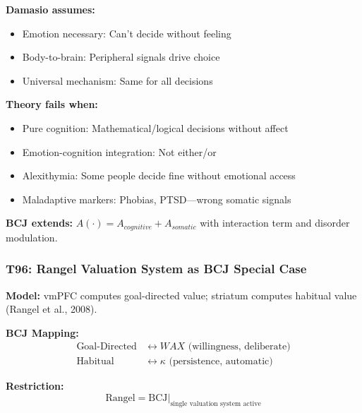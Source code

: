 \begin{tcolorbox}[colback=red!5!white, colframe=red!75!black,
    title=Boundary Condition: Where Damasio Fails]
\textbf{Damasio assumes:}
\begin{itemize}[nosep]
\item Emotion necessary: Can't decide without feeling
\item Body-to-brain: Peripheral signals drive choice
\item Universal mechanism: Same for all decisions
\end{itemize}

\textbf{Theory fails when:}
\begin{itemize}[nosep]
\item Pure cognition: Mathematical/logical decisions without affect
\item Emotion-cognition integration: Not either/or
\item Alexithymia: Some people decide fine without emotional access
\item Maladaptive markers: Phobias, PTSD---wrong somatic signals
\end{itemize}

\textbf{BCJ extends:} $A(\cdot) = A_{cognitive} + A_{somatic}$ with interaction term and disorder modulation.
\end{tcolorbox}

\subsubsection*{T96: Rangel Valuation System as BCJ Special Case}

\textbf{Model:} vmPFC computes goal-directed value; striatum computes habitual value (Rangel et al., 2008).

\textbf{BCJ Mapping:}
\begin{align}
\text{Goal-Directed} &\leftrightarrow WAX \text{ (willingness, deliberate)} \\
\text{Habitual} &\leftrightarrow \kappa \text{ (persistence, automatic)}
\end{align}

\textbf{Restriction:}
\begin{equation}
\text{Rangel} = \text{BCJ} \big|_{\text{single valuation system active}}
\end{equation}

